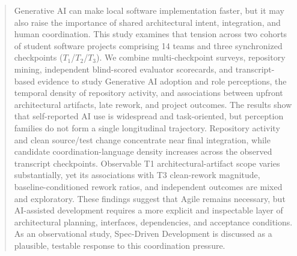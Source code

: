 \begin{abstract}
Generative AI can make local software implementation faster, but it may also raise the importance of shared architectural intent, integration, and human coordination. This study examines that tension across two cohorts of student software projects comprising 14 teams and three synchronized checkpoints ($T_1$/$T_2$/$T_3$). We combine multi-checkpoint surveys, repository mining,
independent blind-scored evaluator scorecards, and transcript-based evidence to study Generative AI adoption and role perceptions, the temporal density of repository activity, and associations between upfront architectural artifacts, late rework, and project outcomes. The results show that self-reported AI use
is widespread and task-oriented, but perception families do not form a single longitudinal trajectory. Repository activity and clean source/test change concentrate near final integration, while candidate coordination-language density increases across the observed transcript checkpoints. Observable T1 architectural-artifact scope varies substantially, yet its associations with
T3 clean-rework magnitude, baseline-conditioned rework ratios, and independent outcomes are mixed and exploratory. These findings suggest that Agile remains necessary, but AI-assisted development requires a more explicit and inspectable layer of architectural planning, interfaces, dependencies, and acceptance conditions. As an observational study, Spec-Driven Development is discussed as a plausible, testable response to this coordination pressure.
\end{abstract}
